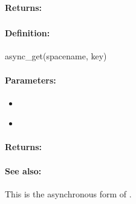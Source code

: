 \paragraph{Returns:}


\pagebreak
\subsubsection{}
\label{api:ruby:async_get}


\paragraph{Definition:}
\begin{rubycode}
async_get(spacename, key)
\end{rubycode}

\paragraph{Parameters:}
\begin{itemize}[noitemsep]
\item {}\\

\item {}\\

\end{itemize}

\paragraph{Returns:}


\paragraph{See also:}  This is the asynchronous form of .

\pagebreak
\subsubsection{}
\label{api:ruby:get_partial}


